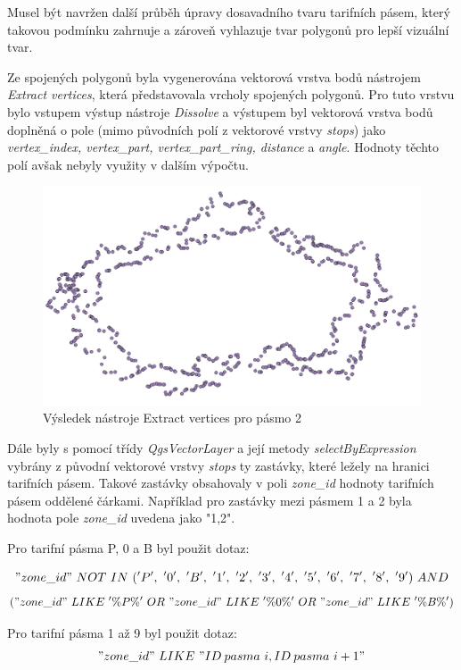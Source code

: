 Musel být navržen další průběh úpravy dosavadního tvaru tarifních pásem, který takovou podmínku zahrnuje
a zároveň vyhlazuje tvar polygonů pro lepší vizuální tvar.  

Ze spojených polygonů byla vygenerována vektorová vrstva bodů nástrojem
\textit{Extract vertices}, která představovala vrcholy spojených polygonů. Pro tuto vrstvu
bylo vstupem výstup nástroje \textit{Dissolve} a výstupem byl vektorová vrstva bodů 
doplněná o pole (mimo původních polí z vektorové vrstvy \textit{stops}) jako \textit{vertex\_index,
vertex\_part, vertex\_part\_ring, distance} a \textit{angle}.
Hodnoty těchto polí avšak nebyly využity v dalším výpočtu.

\begin{figure}[H] \centering
    \includegraphics[width=400pt]{./pictures/vertices.png}
    \caption[Výsledek nástroje Extract vertices pro pásmo 2]{Výsledek nástroje Extract vertices pro pásmo 2}
	\label{fig:vertices}              
\end{figure} 

Dále byly s pomocí třídy \textit{QgsVectorLayer} a její metody \textit{selectByExpression} vybrány 
z původní vektorové vrstvy \textit{stops} ty zastávky, které ležely na hranici tarifních pásem.
Takové zastávky obsahovaly v poli \textit{zone\_id} hodnoty tarifních pásem oddělené čárkami.
Například pro zastávky mezi pásmem 1 a 2 byla hodnota pole \textit{zone\_id} uvedena jako "1,2".

Pro tarifní pásma P, 0 a B byl použit dotaz:

\["zone\_id"\ NOT\ IN\ ('P',\ '0',\ 'B',\ '1',\ '2',\ '3',\ '4',\ '5',\ '6',\ '7',\ '8',\ '9')\ AND\]
\[("zone\_id"\ LIKE\ '\%P\%'\ OR\ "zone\_id"\ LIKE\ '\%0\%'\ OR\ "zone\_id"\ LIKE\ '\%B\%')\]

Pro tarifní pásma 1 až 9 byl použit dotaz:
\["zone\_id"\ LIKE\ "ID\: pasma\ i,ID\: pasma\ i+1"\]

